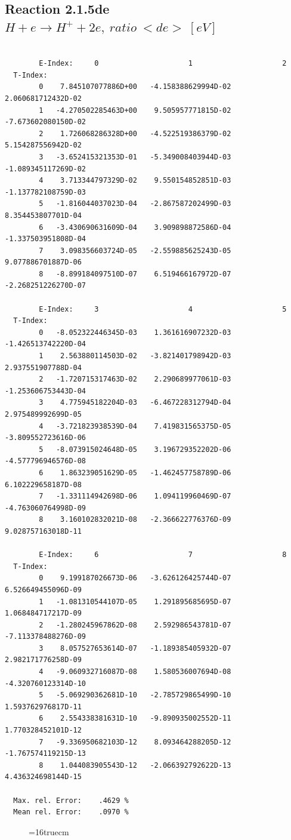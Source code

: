 \documentclass[12pt,dvips]{article}
\begin{document}
\newpage

\subsection{
Reaction 2.1.5de  $ H + e \rightarrow H^+ + 2e, \ ratio~   <de> \ [eV]$}


\begin{small}\begin{verbatim}

        E-Index:     0                     1                     2
  T-Index:
        0    7.845107077886D+00   -4.158388629994D-02    2.060681712432D-02
        1   -4.270502285463D+00    9.505957771815D-02   -7.673602080150D-02
        2    1.726068286328D+00   -4.522519386379D-02    5.154287556942D-02
        3   -3.652415321353D-01   -5.349008403944D-03   -1.089345117269D-02
        4    3.713344797329D-02    9.550154852851D-03   -1.137782108759D-03
        5   -1.816044037023D-04   -2.867587202499D-03    8.354453807701D-04
        6   -3.430690631609D-04    3.909898872586D-04   -1.337503951808D-04
        7    3.098356603724D-05   -2.559885625243D-05    9.077886701887D-06
        8   -8.899184097510D-07    6.519466167972D-07   -2.268251226270D-07

        E-Index:     3                     4                     5
  T-Index:
        0   -8.052322446345D-03    1.361616907232D-03   -1.426513742220D-04
        1    2.563880114503D-02   -3.821401798942D-03    2.937551907788D-04
        2   -1.720715317463D-02    2.290689977061D-03   -1.253606753443D-04
        3    4.775945182204D-03   -6.467228312794D-04    2.975489992699D-05
        4   -3.721823938539D-04    7.419831565375D-05   -3.809552723616D-06
        5   -8.073915024648D-05    3.196729352202D-06   -4.577796946576D-08
        6    1.863239051629D-05   -1.462457758789D-06    6.102229658187D-08
        7   -1.331114942698D-06    1.094119960469D-07   -4.763060764998D-09
        8    3.160102832021D-08   -2.366622776376D-09    9.028757163018D-11

        E-Index:     6                     7                     8
  T-Index:
        0    9.199187026673D-06   -3.626126425744D-07    6.526649455096D-09
        1   -1.081310544107D-05    1.291895685695D-07    1.068484717217D-09
        2   -1.280245967862D-08    2.592986543781D-07   -7.113378488276D-09
        3    8.057527653614D-07   -1.189385405932D-07    2.982171776258D-09
        4   -9.060932716087D-08    1.580536007694D-08   -4.320760123314D-10
        5   -5.069290362681D-10   -2.785729865499D-10    1.593762976817D-11
        6    2.554338381631D-10   -9.890935002552D-11    1.770328452101D-12
        7   -9.336950682103D-12    8.093464288205D-12   -1.767574119215D-13
        8    1.044083905543D-12   -2.066392792622D-13    4.436324698144D-15

  Max. rel. Error:    .4629 %
  Mean rel. Error:    .0970 %

\end{verbatim}\end{small}
\begin{figure} \label{2.1.5li2}
\epsfxsize=16truecm
\end{figure}
\newpage
\end{document}
